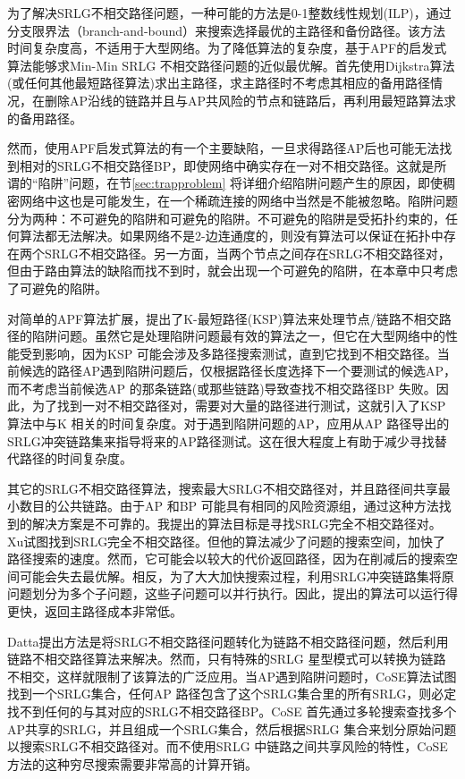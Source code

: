 为了解决SRLG不相交路径问题，一种可能的方法是0-1整数线性规划(ILP)\cite{hu2003diverse}，通过分支限界法（branch-and-bound）来搜索选择最优的主路径和备份路径。该方法时间复杂度高，不适用于大型网络。为了降低算法的复杂度，基于APF的启发式算法能够求Min-Min SRLG 不相交路径问题的近似最优解。首先使用Dijkstra算法(或任何其他最短路径算法)求出主路径，求主路径时不考虑其相应的备用路径情况，在删除AP沿线的链路并且与AP共风险的节点和链路后，再利用最短路算法求的备用路径。

然而，使用APF启发式算法的有一个主要缺陷，一旦求得路径AP后也可能无法找到相对的SRLG不相交路径BP，即使网络中确实存在一对不相交路径。这就是所谓的“陷阱”问题，在节\ref{sec:trapproblem} 将详细介绍陷阱问题产生的原因，即使稠密网络中\cite{laborczi2001solving}这也是可能发生，在一个稀疏连接的网络中当然是不能被忽略。陷阱问题分为两种：不可避免的陷阱和可避免的陷阱。不可避免的陷阱是受拓扑约束的，任何算法都无法解决。如果网络不是2-边连通度的，则没有算法可以保证在拓扑中存在两个SRLG不相交路径。另一方面，当两个节点之间存在SRLG不相交路径对，但由于路由算法的缺陷而找不到时，就会出现一个可避免的陷阱，在本章中只考虑了可避免的陷阱。

对简单的APF算法扩展，提出了K-最短路径(KSP)算法来处理节点/链路不相交路径的陷阱问题。虽然它是处理陷阱问题最有效的算法之一，但它在大型网络中的性能受到影响，因为KSP 可能会涉及多路径搜索测试，直到它找到不相交路径。当前候选的路径AP遇到陷阱问题后，仅根据路径长度选择下一个要测试的候选AP，而不考虑当前候选AP 的那条链路(或那些链路)导致查找不相交路径BP 失败。因此，为了找到一对不相交路径对，需要对大量的路径进行测试，这就引入了KSP算法中与K 相关的时间复杂度。对于遇到陷阱问题的AP，应用从AP 路径导出的SRLG冲突链路集来指导将来的AP路径测试。这在很大程度上有助于减少寻找替代路径的时间复杂度。

其它的SRLG不相交路径算法\cite{rostami2012msdp,rostami2007cose,datta2008graph,xu2003new,todimala2004imsh}，搜索最大SRLG不相交路径对，并且路径间共享最小数目的公共链路。由于AP 和BP 可能具有相同的风险资源组，通过这种方法找到的解决方案是不可靠的。我提出的算法目标是寻找SRLG完全不相交路径对。Xu\cite{xu2003trap}试图找到SRLG完全不相交路径。但他的算法减少了问题的搜索空间，加快了路径搜索的速度。然而，它可能会以较大的代价返回路径，因为在削减后的搜索空间可能会失去最优解。相反，为了大大加快搜索过程，利用SRLG冲突链路集将原问题划分为多个子问题，这些子问题可以并行执行。因此，提出的算法可以运行得更快，返回主路径成本非常低。

Datta\cite{datta2008graph}提出方法是将SRLG不相交路径问题转化为链路不相交路径问题，然后利用链路不相交路径算法来解决。然而，只有特殊的SRLG 星型模式可以转换为链路不相交，这样就限制了该算法的广泛应用。当AP遇到陷阱问题时，CoSE\cite{rostami2007cose}算法试图找到一个SRLG集合，任何AP 路径包含了这个SRLG集合里的所有SRLG，则必定找不到任何的与其对应的SRLG不相交路径BP。CoSE 首先通过多轮搜索查找多个AP共享的SRLG，并且组成一个SRLG集合，然后根据SRLG 集合来划分原始问题以搜索SRLG不相交路径对。而不使用SRLG 中链路之间共享风险的特性，CoSE方法的这种穷尽搜索需要非常高的计算开销。



